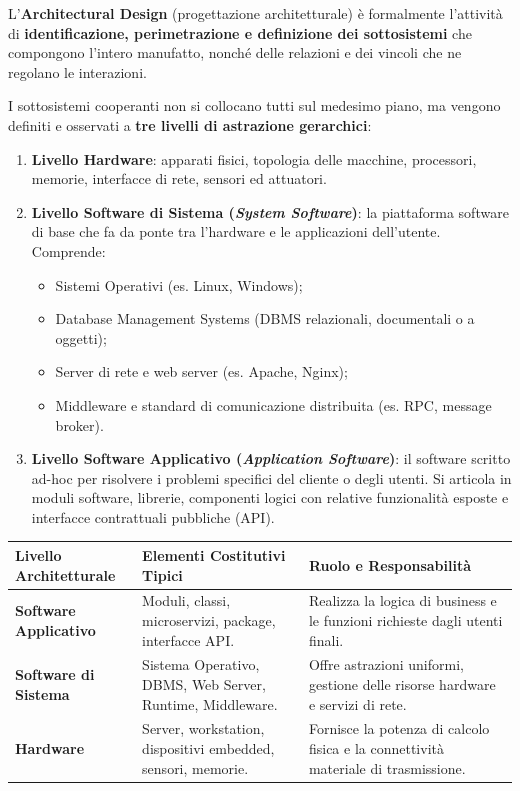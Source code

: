 \documentclass[12pt]{extarticle}
\begin{document}
\noindent L'\textbf{Architectural Design} (progettazione architetturale) è formalmente l'attività di \textbf{identificazione, perimetrazione e definizione dei sottosistemi} che compongono l'intero manufatto, nonché delle relazioni e dei vincoli che ne regolano le interazioni.

\noindent I sottosistemi cooperanti non si collocano tutti sul medesimo piano, ma vengono definiti e osservati a \textbf{tre livelli di astrazione gerarchici}:
\begin{enumerate}
    \item \textbf{Livello Hardware}: apparati fisici, topologia delle macchine, processori, memorie, interfacce di rete, sensori ed attuatori.
    \item \textbf{Livello Software di Sistema (\textit{System Software})}: la piattaforma software di base che fa da ponte tra l'hardware e le applicazioni dell'utente. Comprende:
    \begin{itemize}
        \item Sistemi Operativi (es. Linux, Windows);
        \item Database Management Systems (DBMS relazionali, documentali o a oggetti);
        \item Server di rete e web server (es. Apache, Nginx);
        \item Middleware e standard di comunicazione distribuita (es. RPC, message broker).
    \end{itemize}
    \item \textbf{Livello Software Applicativo (\textit{Application Software})}: il software scritto ad-hoc per risolvere i problemi specifici del cliente o degli utenti. Si articola in moduli software, librerie, componenti logici con relative funzionalità esposte e interfacce contrattuali pubbliche (API).
\end{enumerate}

\begin{center}
\small
\begin{tabular}{p{3.2cm}p{4.8cm}p{6.4cm}}
    \toprule
    \textbf{Livello Architetturale} & \textbf{Elementi Costitutivi Tipici} & \textbf{Ruolo e Responsabilità} \\
    \midrule
    \textbf{Software Applicativo} & Moduli, classi, microservizi, package, interfacce API. & Realizza la logica di business e le funzioni richieste dagli utenti finali. \\
    \addlinespace
    \textbf{Software di Sistema} & Sistema Operativo, DBMS, Web Server, Runtime, Middleware. & Offre astrazioni uniformi, gestione delle risorse hardware e servizi di rete. \\
    \addlinespace
    \textbf{Hardware} & Server, workstation, dispositivi embedded, sensori, memorie. & Fornisce la potenza di calcolo fisica e la connettività materiale di trasmissione. \\
    \bottomrule
\end{tabular}
\end{center}
\end{document}
